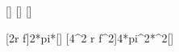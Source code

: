 [\kg]
[\m]
[\per\second]

[2\pi r f]{2*pi*\lhX*\fhX}[\mps]
[4\pi^2 r f^2]{4*pi^2*\lhX*\fhX^2}[\mpss]
